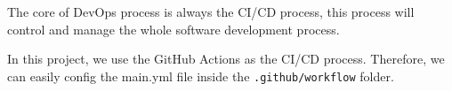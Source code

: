 The core of DevOps process is always the CI/CD process, this process will control
and manage the whole software development process.

In this project, we use the GitHub Actions as the CI/CD process.
Therefore, we can easily config the main.yml file inside the \texttt{.github/workflow} folder.

